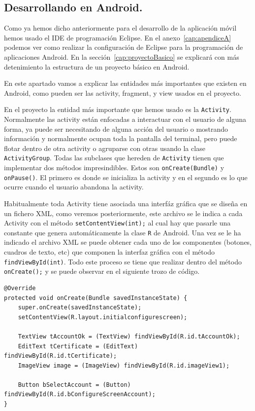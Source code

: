 \subsection{Desarrollando en Android.}\label{cap:desarrollandoAndroid}

Como ya hemos dicho anteriormente para el desarrollo de la aplicación móvil hemos usado el IDE de programación Eclipse. En el anexo~\ref{cap:apendiceA} podemos ver como realizar la configuración de Eclipse para la programación de aplicaciones Android. En la sección~\ref{cap:proyectoBasico} se explicará con más detenimiento la estructura de un proyecto básico en Android.

En este apartado vamos a explicar las entidades más importantes que existen en Android, como pueden ser las activity, fragment, y view usados en el proyecto.

En el proyecto la entidad más importante que hemos usado es la \lstinline{Activity}. Normalmente las activity están enfocadas a interactuar con el usuario de alguna forma, ya puede ser necesitando de alguna acción del usuario o mostrando información y normalmente ocupan toda la pantalla del terminal, pero puede flotar dentro de otra activity o agruparse con otras usando la clase \lstinline{ActivityGroup}. Todas las subclases que hereden de \lstinline{Activity} tienen que implementar dos métodos impresindibles. Estos son \lstinline{onCreate(Bundle)} y \lstinline{onPause()}. El primero es donde se inicializa la activity y en el segundo es lo que ocurre cuando el usuario abandona la activity.

Habitualmente toda Activity tiene asociada una interfáz gráfica que se diseña en un fichero XML, como veremos posteriormente, este archivo se le indica a cada Activity con el método \lstinline{setContentView(int);} al cual hay que pasarle una constante que genera automáticamente la clase \lstinline{R} de Android. Una vez se le ha indicado el archivo XML se puede obtener cada uno de los componentes (botones, cuadros de texto, etc) que componen la interfaz gráfica con el método \lstinline{findViewById(int)}. Todo este proceso se tiene que realizar dentro del método \lstinline{onCreate();} y se puede observar en el siguiente trozo de código.

\begin{lstlisting}[style=Java]
@Override
protected void onCreate(Bundle savedInstanceState) {
	super.onCreate(savedInstanceState);
	setContentView(R.layout.initialconfigurescreen);

	TextView tAccountOk = (TextView) findViewById(R.id.tAccountOk);
	EditText tCertificate = (EditText) findViewById(R.id.tCertificate);
	ImageView image = (ImageView) findViewById(R.id.imageView1);

	Button bSelectAccount = (Button) findViewById(R.id.bConfigureScreenAccount);
}
\end{lstlisting}

